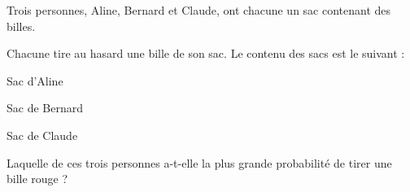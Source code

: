 \documentclass[a4paper,10pt]{report}
\begin{document}
\vspace{-1mm}
\begin{ex}
Trois personnes, Aline, Bernard et Claude, ont chacune un sac contenant des billes.

\noindent Chacune tire au hasard une bille de son sac. Le contenu des sacs est le suivant :

\medskip
\noindent \begin{minipage}{4.5cm}
\begin{center}
Sac d'Aline

\medskip
{}
\end{center}
\end{minipage}
\begin{minipage}{5cm}
\begin{center}
Sac de Bernard

\medskip
{}
\end{center}
\end{minipage}
\hspace{1.5cm}
\begin{minipage}{5cm}
\begin{center}
Sac de Claude

\medskip
{}
\end{center}
\end{minipage}

\medskip 
\noindent Laquelle de ces trois personnes a-t-elle la plus grande probabilité de tirer une bille rouge ?
\end{ex}
\end{document}
